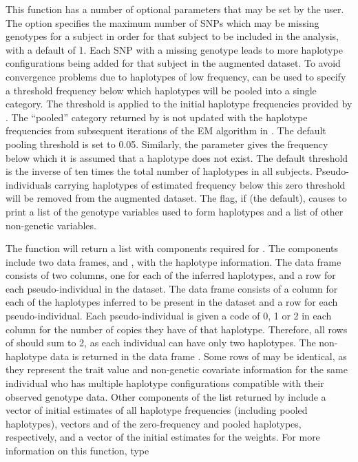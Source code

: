 \documentclass[article, shortnames]{jss}
\begin{document}
This function has a number of optional parameters that may be set by the
user. The option  specifies the maximum number of 
SNPs which may be missing genotypes for a subject in order
for that subject to be included 
in the analysis, with a default of 1. Each SNP with a missing genotype 
leads to more haplotype configurations being added for that subject in 
the augmented dataset. 
To avoid convergence problems due to haplotypes of low frequency, 
 can be used to specify a threshold frequency below 
which haplotypes will be pooled into a single category. 
The threshold is applied to the initial haplotype
frequencies provided by . The ``pooled'' category
returned by  is not updated 
with the haplotype frequencies 
from subsequent iterations of the EM algorithm
in .
The default pooling threshold is set to 0.05. 
Similarly, the parameter  
gives the frequency below which it is assumed that a haplotype does not 
exist. The default threshold is the inverse of ten times the 
total number of haplotypes in all subjects. Pseudo-individuals carrying 
haplotypes of estimated frequency below this zero threshold will be removed 
from the augmented dataset.
The  flag, if  (the default),
causes  to print a list of the genotype
variables used to form haplotypes and a list of other non-genetic
variables.

The function  will return a list with components 
required for . The components include two data frames,
 and , with the haplotype information. 
The data frame  consists of two columns, one for each of the 
inferred haplotypes, and a row for each pseudo-individual in the dataset. 
The data frame  consists of a column for each of the haplotypes 
inferred to be present in the dataset and a row for each pseudo-individual. 
Each pseudo-individual is given a code of 0, 1 or 2 in each column for the 
number of copies they have of that haplotype. Therefore, all  
rows of  should sum to 2, as each individual can have 
only two haplotypes. The non-haplotype data is returned in the data frame 
. Some rows of  may be identical, as they 
represent the trait value and non-genetic covariate information for the same 
individual who has multiple haplotype configurations compatible with
their observed genotype data. Other components of the list returned by 
 include a vector  of initial estimates of 
all haplotype frequencies (including pooled haplotypes), vectors  
and  of the zero-frequency and pooled haplotypes, 
respectively, and a vector  of the initial estimates for the 
weights. For more information on this function, type
\end{document}
